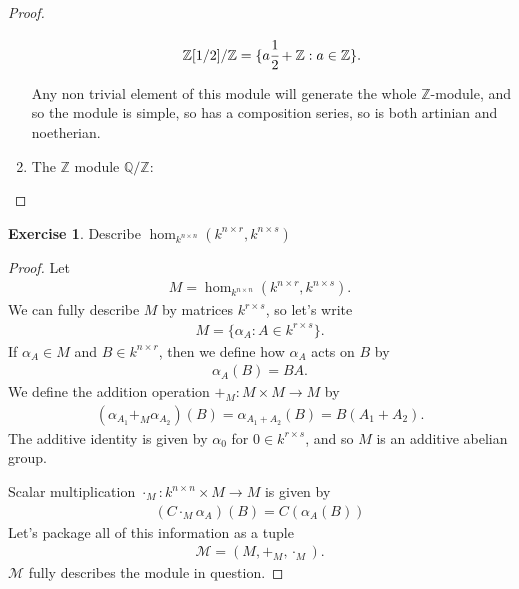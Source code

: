 \documentclass[12pt]{extarticle}
\newcommand{\set}[1]{\{#1\}}
\newcommand{\Q}{\mathbb{Q}}
\newcommand{\Z}{\mathbb{Z}}
\newcommand{\<}{\langle}
\renewcommand{\>}{\rangle}
\theoremstyle{definition}
\newtheorem{exercise}{Exercise}
\begin{document}
\begin{proof}
\begin{enumerate}
    \begin{align*}
      \Z[1/2]/\Z = \set{a\cfrac{1}{2} + \Z: a \in \Z}.
    \end{align*}

    Any non trivial element of this module will generate the whole $\Z$-module, and so the module is simple, so has a composition series, so is both artinian and noetherian.
    
  \item
    The $\Z$ module $\Q/\Z$:
    
    
  \end{enumerate}
\end{proof}

\begin{exercise}
  Describe $\hom_{k^{n \times n}}(k^{n \times r}, k^{n \times s})$
\end{exercise}
\begin{proof}
  Let 
  \begin{align*}
    M = \hom_{k^{n \times n}}(k^{n \times r}, k^{n \times s}).
  \end{align*}
  We can fully describe $M$ by matrices $k^{r \times s}$, so let's write
  \begin{align*}
    M = \set{\alpha_A : A \in k^{r \times s}}.
  \end{align*}
  If $\alpha_A \in M$ and $B \in k^{n \times r}$, then we define how $\alpha_A$ acts on $B$ by
  \begin{align*}
    \alpha_A(B) = BA.
  \end{align*}
  We define the addition operation $+_M: M \times M \to M$ by 
  \begin{align*}
    (\alpha_{A_1} +_M \alpha_{A_2})(B) = \alpha_{A_1 + A_2}(B) = B(A_1 + A_2).
  \end{align*}
  The additive identity is given by $\alpha_0$ for $0 \in k^{r \times s}$, and so $M$ is an additive abelian group.
  
  Scalar multiplication $\cdot_M: k^{n \times n} \times M \to M$ is given by
  \begin{align*}
    (C \cdot_M \alpha_A) (B) = C(\alpha_A(B))
  \end{align*}
  Let's package all of this information as a tuple
  \begin{align*}
    \mathcal{M} = (M, +_M, \cdot_M).
  \end{align*}
  $\mathcal{M}$ fully describes the module in question. 
\end{proof}
\end{document}
